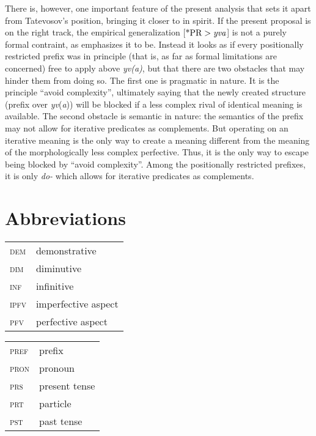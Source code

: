 \documentclass[output=paper,
colorlinks,
citecolor=brown,
newtxmath
]{langscibook}
\begin{document}
There is, however, one important feature of the present analysis that sets it apart from Tatevosov's position, bringing it closer to \citet{Zinova2016} in spirit. If the present proposal is on the right track, the empirical generalization [$\text{*PR}>\text{\textit{yva}}$] is not a purely formal contraint, as \citet{Tatevosov2013b} emphasizes it to be. Instead it looks as if every positionally restricted prefix was in principle (that is, as far as formal limitations are concerned) free to apply above \textit{yv(a)}, but that there are two obstacles that may hinder them from doing so. The first one is pragmatic in nature. It is the principle ``avoid complexity'', ultimately saying that the newly created structure (prefix over \textit{yv}(\textit{a})) will be blocked if a less complex rival of identical meaning is available. The second obstacle is semantic in nature: the semantics of the prefix may not allow for iterative predicates as complements. But operating on an iterative meaning is the only way to create a meaning different from the meaning of the morphologically less complex perfective. Thus, it is the only way to escape being blocked by ``avoid complexity''.
Among the positionally restricted prefixes, it is only \textit{do-} which allows for iterative predicates as complements.


\section*{Abbreviations}

\begin{tabularx}{.45\textwidth}{lX}
\textsc{dem} & demonstrative\\
\textsc{dim} & diminutive\\
\textsc{inf} & infinitive\\
\textsc{ipfv} & imperfective aspect\\
\textsc{pfv} & perfective aspect\\
\end{tabularx}%
\begin{tabularx}{.45\textwidth}{lX}
\textsc{pref} & prefix\\
\textsc{pron} & pronoun\\
\textsc{prs} & present tense\\
\textsc{prt} & particle\\
\textsc{pst} & past tense\\
\end{tabularx}
\end{document}
